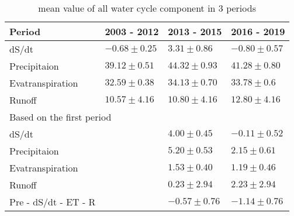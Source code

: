 \begin{table}[htbp]\centering
	\begin{tabular}{|l|l|l|l|}
		\hline
		Period &  2003 - 2012 & 2013 - 2015 & 2016 - 2019  \\ \hline
		dS/dt            & $-0.68 \pm 0.25$     & $3.31 \pm 0.86$        & $-0.80 \pm 0.57$        \\ \hline
		Precipitaion               & $39.12 \pm 0.51$      & $44.32 \pm 0.93$       &$41.28 \pm 0.80$        \\ \hline
		Evatranspiration           & $32.59 \pm 0.38$       & $34.13 \pm 0.70$       & $33.78 \pm 0.6$        \\ \hline
		Runoff                     & $10.57  \pm 4.16$      & $10.80 \pm 4.16 $     & $12.80 \pm 4.16 $      \\ \hline
		\multicolumn{4}{|l|}{Based on the first period}                                         \\ \hline
		dS/dt           &             & $4.00 \pm 0.45$        & $-0.11 \pm 0.52$        \\ \hline
		Precipitaion               &             & $5.20 \pm 0.53$        & $2.15 \pm 0.61$         \\ \hline
		Evatranspiration           &             & $1.53 \pm 0.40$        & $1.19 \pm 0.46 $        \\ \hline
		Runoff                     &             & $0.23 \pm 2.94 $       & $2.23 \pm 2.94   $      \\ \hline
		Pre - dS/dt - ET - R &             & $-0.57 \pm 0.76$       & $-1.14 \pm 0.76 $    \\ \hline 
	\end{tabular}
	\caption{mean value of all water cycle component in 3 periods}
\end{table}